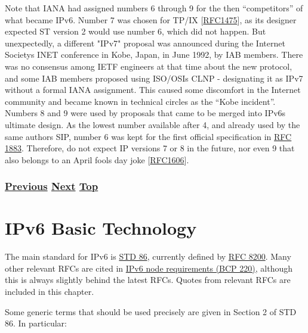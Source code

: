 \documentclass[
]{article}
\begin{document}
Note that IANA had assigned numbers 6 through 9 for the then
``competitors'' of what became IPv6. Number 7 was chosen for TP/IX
{[}\href{https://www.rfc-editor.org/info/rfc1475}{RFC1475}{]}, as its
designer expected ST version 2 would use number 6, which did not happen.
But unexpectedly, a different "IPv7" proposal was announced during the
Internet Society\textquotesingle s INET conference in Kobe, Japan, in
June 1992, by IAB members. There was no consensus among IETF engineers
at that time about the new protocol, and some IAB members proposed using
ISO/OSI\textquotesingle s CLNP - designating it as IPv7 without a formal
IANA assignment. This caused some discomfort in the Internet community
and became known in technical circles as the ``Kobe incident''. Numbers
8 and 9 were used by proposals that came to be merged into
IPv6\textquotesingle s ultimate design. As the lowest number available
after 4, and already used by the same author\textquotesingle s SIP,
number 6 was kept for the first official specification in
\href{https://www.rfc-editor.org/info/rfc1883}{RFC 1883}. Therefore, do
not expect IP versions 7 or 8 in the future, nor even 9 that also
belongs to an April fool\textquotesingle s day joke
{[}\href{https://www.rfc-editor.org/info/rfc1606}{RFC1606}{]}.

\subsubsection{\texorpdfstring{\hyperref[acknowledgments]{Previous}
\hyperref[ipv6-basic-technology]{Next}
\hyperref[introduction-and-foreword]{Top}}{Previous Next Top}}\label{previous-next-top-7}

\pagebreak

\section{IPv6 Basic Technology}\label{ipv6-basic-technology}

The main standard for IPv6 is
\href{https://www.rfc-editor.org/info/std86}{STD 86}, currently defined
by \href{https://www.rfc-editor.org/info/rfc8200}{RFC 8200}. Many other
relevant RFCs are cited in
\href{https://www.rfc-editor.org/info/bcp220}{IPv6 node requirements
(BCP 220)}, although this is always slightly behind the latest RFCs.
Quotes from relevant RFCs are included in this chapter.

Some generic terms that should be used precisely are given in Section 2
of STD 86. In particular:
\end{document}
